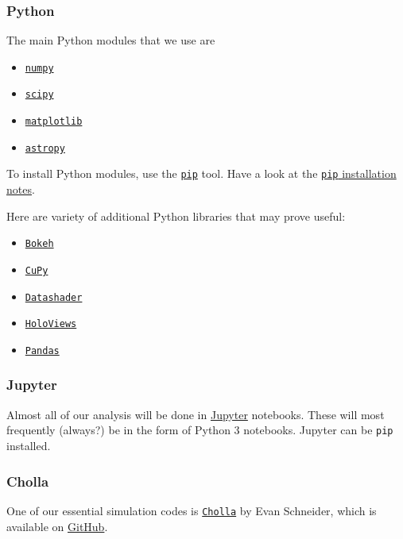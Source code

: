 \subsubsection{Python}
\label{sec:python}

The main Python modules that we use are
\begin{itemize}
	\item \href{https://numpy.org}{\tt numpy}
	\item \href{https://www.scipy.org}{\tt scipy}
	\item \href{https://matplotlib.org}{\tt matplotlib}
	\item \href{https://www.astropy.org}{\tt astropy}
\end{itemize}

\noindent
To install Python modules, use the \href{https://pypi.org/project/pip/}{\tt pip} tool. Have a look at the \href{https://pip.pypa.io/en/stable/installing/}{{\tt pip} installation notes}.


Here are variety of additional Python libraries that may prove useful:
\begin{itemize}
	\item \href{https://bokeh.org/}{\tt Bokeh}
	\item \href{https://cupy.dev/}{\tt CuPy}
	\item \href{https://datashader.org/}{\tt Datashader}
	\item \href{https://holoviews.org/}{\tt HoloViews}
	\item \href{https://pandas.pydata.org/}{\tt Pandas}	
\end{itemize}

\subsubsection{Jupyter}
\label{sec:jupyter}

Almost all of our analysis will be done in \href{https://jupyter.org/}{Jupyter} notebooks. These will most frequently (always?) be in the form of Python 3 notebooks. Jupyter can be {\tt pip} installed.

\subsubsection{Cholla}
\label{sec:cholla}

One of our essential simulation codes is \href{https://github.com/cholla-hydro/cholla}{{\tt Cholla}} by Evan Schneider, which is available on \href{https://github.com}{GitHub}.

